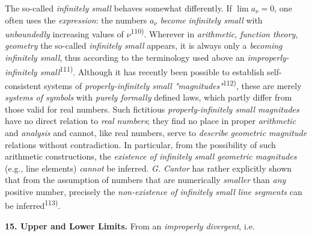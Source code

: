 \thispagestyle{fancy}

\vspace{0.5cm}

The so-called \textit{infinitely small} behaves somewhat differently. If $\lim a_\nu = 0$, one often uses the \textit{expression}: the numbers $a_\nu$ \textit{become} \textit{infinitely small} with \textit{unboundedly} increasing values of $\nu$\textsuperscript{110)}. Wherever in \textit{arithmetic}, \textit{function theory}, \textit{geometry} the so-called \textit{infinitely small} appears, it is always only a \textit{becoming infinitely small}, thus according to the terminology used above an \textit{improperly-infinitely small}\textsuperscript{111)}. Although it has recently been possible to establish self-consistent systems of \textit{properly-infinitely small "magnitudes"}\textsuperscript{112)}, these are merely \textit{systems of symbols} with \textit{purely formally} defined laws, which partly differ from those valid for real numbers. Such fictitious \textit{properly-infinitely small magnitudes} have no direct relation to \textit{real numbers}; they find no place in proper \textit{arithmetic} and \textit{analysis} and cannot, like real numbers, serve to \textit{describe} \textit{geometric magnitude} relations without contradiction. In particular, from the possibility of such arithmetic constructions, the \textit{existence of infinitely small geometric magnitudes} (e.g., line elements) \textit{cannot} be inferred. \textit{G. Cantor} has rather explicitly shown that from the assumption of numbers that are numerically \textit{smaller} than \textit{any} positive number, precisely the \textit{non-existence of infinitely small line segments} can be inferred\textsuperscript{113)}.

\vspace{0.3cm}

\textbf{15. Upper and Lower Limits.} From an \textit{improperly divergent}, i.e.

